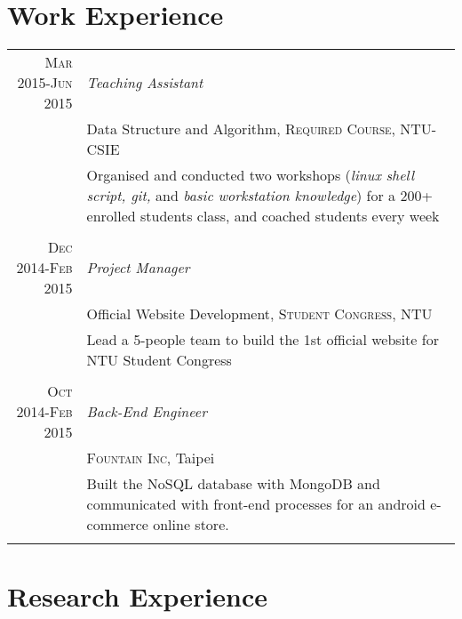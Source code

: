 \documentclass[a4paper,10pt]{article} %
\begin{document}

\section{Work Experience}

\begin{tabular}{r|p{11cm}}

\textsc{Mar 2015-Jun 2015} & \emph{Teaching Assistant}\\
& Data Structure and Algorithm, \textsc{Required Course}, NTU-CSIE \\ 
& \footnotesize{Organised and conducted two workshops (\textit{linux shell script, git,} and \textit{basic workstation knowledge}) for a 200+ enrolled students class, and coached students every week}\\
\multicolumn{2}{c}{} \\

\textsc{Dec 2014-Feb 2015} & \emph{Project Manager}\\
& Official Website Development, \textsc{Student Congress}, NTU \emph{}\\
& \footnotesize{Lead a 5-people team to build the 1st official website for NTU Student Congress}\\
\multicolumn{2}{c}{} \\

\textsc{Oct 2014-Feb 2015} & \emph{Back-End Engineer}\\ 
& \textsc{Fountain Inc}, Taipei \emph{}\\
& \footnotesize{Built the NoSQL database with MongoDB and communicated with front-end processes for an android e-commerce online store.}\\
\multicolumn{2}{c}{} \\

\end{tabular}

\section{Research Experience}
\end{document}
